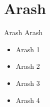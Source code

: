 \section{Arash}
\begin{frame}{Arash}{}
  Arash
  \begin{itemize}
    \item<1-> Arash 1
    \item<2-> Arash 2
    \item<3-> Arash 3
    \item<4-> Arash 4
  \end{itemize}
\end{frame}
